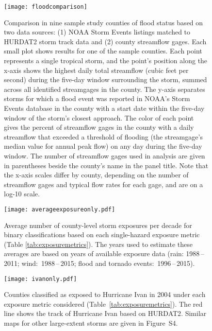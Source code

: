 \begin{figure}[tbhp!]
\centering
\texttt{[image: floodcomparison]}
\caption{Comparison in nine sample study counties of flood status based on
	two data sources: (1) NOAA Storm Events listings matched to \ac{HURDAT2} storm track data
	and (2) county streamflow gages. Each small plot shows results for one of the sample
	counties. Each point represents a single tropical storm, and the
	point's position along the x-axis shows the highest daily total
	streamflow (cubic feet per second) during the five-day window surrounding the storm, 
	summed across all identified
	streamgages in the county. The y-axis separates storms
	for which a flood event was reported in NOAA's Storm Events database
	in the county with a start date within the five-day window of the
	storm's closest approach. The color of each point gives
	the percent of streamflow gages in the county with a daily streamflow
	that exceeded a threshold of flooding (the streamgage's median value
	for annual peak flow) on any day during the five-day window. The number
	of streamflow gages used in analysis are given in parentheses beside
	the county's name in the panel title.  Note that the x-axis scales
	differ by county, depending on the number of streamflow gages and
	typical flow rates for each gage, and are on a log-10 scale.
	}
\label{fig:floodcomparison}
\end{figure}

\clearpage

\begin{figure}%
\centering
\texttt{[image: averageexposureonly.pdf]} 
\caption{Average number of county-level storm exposures per decade for binary 
	classifications based on each
	single-hazard exposure metric (Table \ref{tab:exposuremetrics}). The years used to
	estimate these averages are based on years of available exposure data
	(rain: 1988\,--\,2011; wind:~1988\,--\,2015; flood and
	tornado events:~1996\,--\,2015). } 
\label{fig:averageexposure} 
\end{figure}

\clearpage

\begin{figure}%
\centering
\texttt{[image: ivanonly.pdf]}
\caption{Counties classified as exposed to Hurricane Ivan in 2004 under each
	exposure metric considered (Table~\ref{tab:exposuremetrics}). The red
	line shows the track of Hurricane Ivan based on
	\ac{HURDAT2}.  Similar maps for other
	large-extent storms are given in Figure~S4.
	}
\label{fig:ivanexposure} 
\end{figure}

